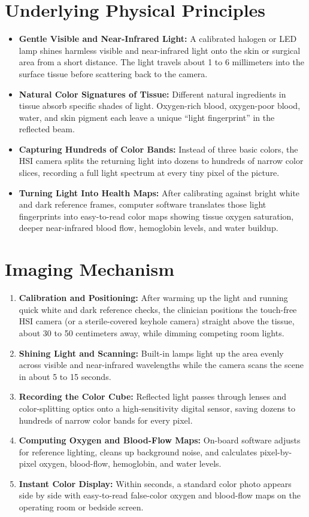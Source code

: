 \section{Underlying Physical Principles}
\begin{itemize}
    \item \textbf{Gentle Visible and Near-Infrared Light:} A calibrated halogen or LED lamp shines harmless visible and near-infrared light onto the skin or surgical area from a short distance. The light travels about 1 to 6 millimeters into the surface tissue before scattering back to the camera.
    \item \textbf{Natural Color Signatures of Tissue:} Different natural ingredients in tissue absorb specific shades of light. Oxygen-rich blood, oxygen-poor blood, water, and skin pigment each leave a unique ``light fingerprint'' in the reflected beam.
    \item \textbf{Capturing Hundreds of Color Bands:} Instead of three basic colors, the HSI camera splits the returning light into dozens to hundreds of narrow color slices, recording a full light spectrum at every tiny pixel of the picture.
    \item \textbf{Turning Light Into Health Maps:} After calibrating against bright white and dark reference frames, computer software translates those light fingerprints into easy-to-read color maps showing tissue oxygen saturation, deeper near-infrared blood flow, hemoglobin levels, and water buildup.
\end{itemize}

\section{Imaging Mechanism}
\begin{enumerate}
    \item \textbf{Calibration and Positioning:} After warming up the light and running quick white and dark reference checks, the clinician positions the touch-free HSI camera (or a sterile-covered keyhole camera) straight above the tissue, about 30 to 50 centimeters away, while dimming competing room lights.
    \item \textbf{Shining Light and Scanning:} Built-in lamps light up the area evenly across visible and near-infrared wavelengths while the camera scans the scene in about 5 to 15 seconds.
    \item \textbf{Recording the Color Cube:} Reflected light passes through lenses and color-splitting optics onto a high-sensitivity digital sensor, saving dozens to hundreds of narrow color bands for every pixel.
    \item \textbf{Computing Oxygen and Blood-Flow Maps:} On-board software adjusts for reference lighting, cleans up background noise, and calculates pixel-by-pixel oxygen, blood-flow, hemoglobin, and water levels.
    \item \textbf{Instant Color Display:} Within seconds, a standard color photo appears side by side with easy-to-read false-color oxygen and blood-flow maps on the operating room or bedside screen.
\end{enumerate}

